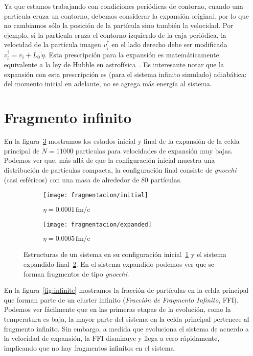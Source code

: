 Ya que estamos trabajando con condiciones periódicas de contorno, cuando una partícula cruza un contorno, debemos considerar la expansión original, por lo que no cambiamos sólo la posición de la partícula sino también la velocidad.
Por ejemplo, si la partícula cruza el contorno izquierdo de la caja periódica, la velocidad de la partícula imagen $v_i^\dagger$ en el lado derecho debe ser modificada $v_i^\dagger = v_i + L_0\,\dot{\eta}$.
Esta prescripción para la expansión es matemáticamente equivalente a la ley de Hubble en astrofísica~\cite{chikazumi_quantum_2001}.
Es interesante notar que la expansión con esta prescripción es (para el sistema infinito simulado) adiabática: del momento inicial en adelante, no se agrega más energía al sistema.

\section{Fragmento infinito}
En la figura~\ref{fig:morpho_frag} mostramos los estados inicial y final de la expansión de la celda principal de $N=11000$ partículas para velocidades de expansión muy bajas.
Podemos ver que, más allá de que la configuración inicial muestra una distribución de partículas compacta, la configuración final consiste de \emph{gnocchi} (casi esféricos) con una masa de alrededor de 80 partículas.

\begin{figure} \centering
  \begin{subfigure}[h!]{0.45\columnwidth}
    \texttt{[image: fragmentacion/initial]}
    \caption{$\eta = 0.0001\,\text{fm/c}$}
    \label{subfig:initial}
  \end{subfigure}
  \begin{subfigure}[h!]{0.45\columnwidth}
    \texttt{[image: fragmentacion/expanded]}
    \caption{$\eta = 0.0005\,\text{fm/c}$}
    \label{subfig:expanded}
  \end{subfigure}
  \caption{Estructuras de un sistema en su configuración inicial~\ref{subfig:initial} y el sistema expandido final~\ref{subfig:expanded}.
    En el sistema expandido podemos ver que se forman fragmentos de tipo \emph{gnocchi}.}
  \label{fig:morpho_frag}
\end{figure}

En la figura~\ref{fig:infinite} mostramos la fracción de partículas en la celda principal que forman parte de un cluster infinito (\emph{Fracción de Fragmento Infinito}, FFI).
Podemos ver fácilmente que en las primeras etapas de la evolución, como la temperatura es baja, la mayor parte del sistema en la celda principal pertenece al fragmento infinito.
Sin embargo, a medida que evoluciona el sistema de acuerdo a la velocidad de expansión, la FFI disminuye y llega a cero rápidamente, implicando que no hay fragmentos infinitos en el sistema.

